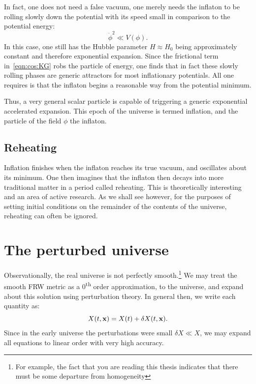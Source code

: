 In fact, one does not need a false vacuum, one merely needs the inflaton to be rolling slowly down the potential with its speed small in comparison to the potential energy:
\begin{equation}
  \dot{\phi}^2 \ll V(\phi).
  \label{eqn:cos:slow_roll}
\end{equation}
In this case, one still has the Hubble parameter $H\approx H_0$ being approximately constant and therefore exponential expansion. Since the frictional term in~\eqref{eqn:cos:KG} robs the particle of energy, one finds that in fact these slowly rolling phases are generic attractors for most inflationary potentials. All one requires is that the inflaton begins a reasonable way from the potential minimum.

Thus, a very general scalar particle is capable of triggering a generic exponential accelerated expansion. This epoch of the universe is termed inflation, and the particle of the field $\phi$ the inflaton.

\subsection{Reheating}
Inflation finishes when the inflaton reaches its true vacuum, and oscillates about its minimum. One then imagines that the inflaton then decays into more traditional matter in a period called reheating. This is theoretically interesting and an area of active research. As we shall see however, for the purposes of setting initial conditions on the remainder of the contents of the universe, reheating can often be ignored.




\section{The perturbed universe}
Observationally, the real universe is not perfectly smooth.\footnote{For example, the fact that you are reading this thesis indicates that there must be some departure from homogeneity}
We may treat the smooth FRW metric as a 0\textsuperscript{th} order approximation, to the universe, and expand about this solution using perturbation theory. In general then, we write each quantity as:
\begin{equation}
  X(t,\mathbf{x}) = X(t) + \delta X(t,\mathbf{x}).
  \label{eqn:cos:expansion}
\end{equation}
Since in the early universe the perturbations were small $\delta X \ll X$, we may expand all equations to linear order with very high accuracy.

